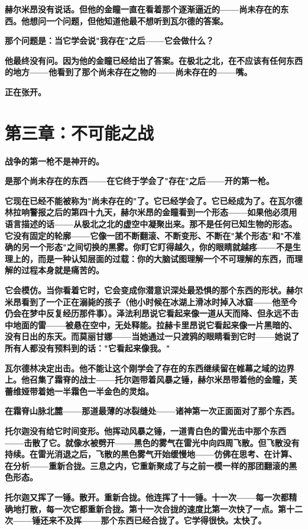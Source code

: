 \documentclass[12pt,a4paper,openany]{ctexbook}
\begin{document}
\textbf{赫尔米昂没有说话。但他的金瞳一直在看着那个逐渐逼近的——尚未存在的东西。他想问一个问题，但他知道他最不想听到瓦尔德的答案。}


\textbf{那个问题是：当它学会说"我存在"之后——它会做什么？}


\textbf{他最终没有问。因为他的金瞳已经给出了答案。在极北之北，在不应该有任何东西的地方——他看到了那个尚未存在之物的——尚未存在的——嘴。}


\textbf{正在张开。}


\section*{第三章：不可能之战}


\textbf{战争的第一枪不是神开的。}


\textbf{是那个尚未存在的东西——在它终于学会了"存在"之后——开的第一枪。}


\textbf{它现在已经不能被称为"尚未存在的"了。它已经学会了。它已经成为了。在瓦尔德林拉响警报之后的第四十九天，赫尔米昂的金瞳看到一个形态——如果他必须用语言描述的话——从极北之北的虚空中凝聚出来。那不是任何已知生物的形态。它没有固定的轮廓——它像一团不断翻滚、不断变形、不断在"某个形态"和"不准确的另一个形态"之间切换的黑雾。你盯它盯得越久，你的眼睛就越疼——不是生理上的，而是一种认知层面的过载：你的大脑试图理解一个不可理解的东西，而理解的过程本身就是痛苦的。}


\textbf{它会模仿。当你看着它时，它会变成你潜意识深处最恐惧的那个东西的形状。赫尔米昂看到了一个正在溺毙的孩子（他小时候在冰湖上滑冰时掉入冰窟——他至今仍会在梦中反复经历那件事）。泽法利昂说它看起来像一道从天而降、但永远不击中地面的雷——被悬在空中，无处释能。拉赫卡里昂说它看起来像一片黑暗的、没有日出的东天。而莫丽甘娜——当她通过一只渡鸦的眼睛看到它时——她说了所有人都没有预料到的话："它看起来像我。"}


\textbf{瓦尔德林决定出击。他不能让这个刚学会了存在的东西继续留在帷幕之域的边界上。他召集了霜脊的战士——托尔迦带着风暴之锤，赫尔米昂带着他的金瞳，芙蕾维娅带着她一半霜色一半金色的灵焰。}


\textbf{在霜脊山脉北麓——那道最薄的冰裂缝处——诸神第一次正面面对了那个东西。}


\textbf{托尔迦没有给它时间变形。他挥动风暴之锤，一道青白色的雷光击中那个东西——击散了它。就像水被劈开——黑色的雾气在雷光中向四周飞散。但飞散没有持续。在雷光消退之后，飞散的黑色雾气开始缓慢地——仿佛在思考、在计算、在分析——重新合拢。三息之内，它重新聚成了与之前一模一样的那团翻滚的黑色形态。}


\textbf{托尔迦又挥了一锤。散开。重新合拢。他连挥了十一锤。十一次——每一次都精确地打散，每一次它都重新合拢。第十一次合拢的速度比第一次快了一点。第十二次——锤还来不及挥——那个东西已经合拢了。它学得很快。太快了。}
\end{document}
